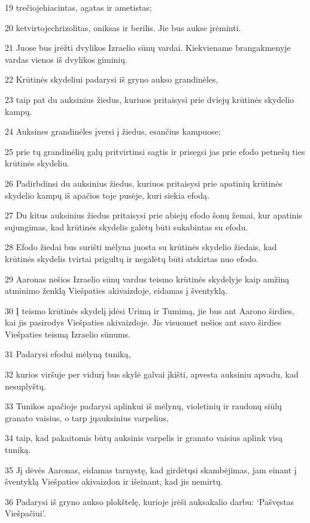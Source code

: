 \par 19 trečioje­hiacintas, agatas ir ametistas; 
\par 20 ketvirtoje­chrizolitas, oniksas ir berilis. Jie bus aukse įrėminti. 
\par 21 Juose bus įrėžti dvylikos Izraelio sūnų vardai. Kiekviename brangakmenyje vardas vienos iš dvylikos giminių. 
\par 22 Krūtinės skydeliui padarysi iš gryno aukso grandinėles, 
\par 23 taip pat du auksinius žiedus, kuriuos pritaisysi prie dviejų krūtinės skydelio kampų. 
\par 24 Auksines grandinėles įversi į žiedus, esančius kampuose; 
\par 25 prie tų grandinėlių galų pritvirtinsi sagtis ir prisegsi jas prie efodo petnešų ties krūtinės skydeliu. 
\par 26 Padirbdinsi du auksinius žiedus, kuriuos pritaisysi prie apatinių krūtinės skydelio kampų iš apačios toje pusėje, kuri siekia efodą. 
\par 27 Du kitus auksinius žiedus pritaisysi prie abiejų efodo šonų žemai, kur apatinis sujungimas, kad krūtinės skydelis galėtų būti sukabintas su efodu. 
\par 28 Efodo žiedai bus surišti mėlyna juosta su krūtinės skydelio žiedais, kad krūtinės skydelis tvirtai prigultų ir negalėtų būti atskirtas nuo efodo. 
\par 29 Aaronas nešios Izraelio sūnų vardus teismo krūtinės skydelyje kaip amžiną atminimo ženklą Viešpaties akivaizdoje, eidamas į šventyklą. 
\par 30 Į teismo krūtinės skydelį įdėsi Urimą ir Tumimą, jie bus ant Aarono širdies, kai jis pasirodys Viešpaties akivaizdoje. Jis visuomet nešios ant savo širdies Viešpaties teismą Izraelio sūnums. 
\par 31 Padarysi efodui mėlyną tuniką, 
\par 32 kurios viršuje per vidurį bus skylė galvai įkišti, apvesta auksiniu apvadu, kad nesuplyštų. 
\par 33 Tunikos apačioje padarysi aplinkui iš mėlynų, violetinių ir raudonų siūlų granato vaisius, o tarp jų­auksinius varpelius, 
\par 34 taip, kad pakaitomis būtų auksinis varpelis ir granato vaisius aplink visą tuniką. 
\par 35 Jį dėvės Aaronas, eidamas tarnystę, kad girdėtųsi skambėjimas, jam einant į šventyklą Viešpaties akivaizdon ir išeinant, kad jis nemirtų. 
\par 36 Padarysi iš gryno aukso plokštelę, kurioje įrėši auksakalio darbu: ‘Pašvęstas Viešpačiui’. 
